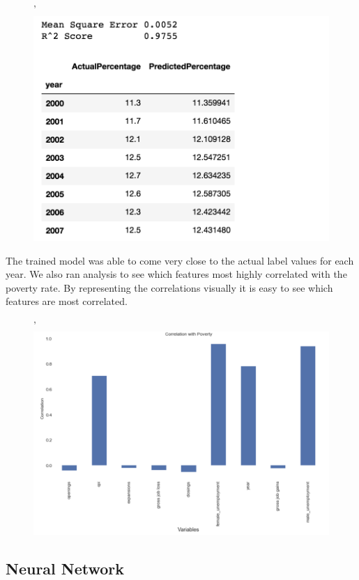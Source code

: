 \documentclass[11pt,letterpaper]{article}
\begin{document}
\begin{figure}[h]'
	\includegraphics[width=\linewidth]{"./pictures/Mse_Score_Predictions"}
\end{figure}

The trained model was able to come very close to the actual label values for each year. We also ran analysis to see which features most highly correlated with the poverty rate. By representing the correlations visually it is easy to see which features are most correlated. 

\begin{figure}[h]'
	\includegraphics[width=\linewidth]{"./pictures/Correlation_With_Poverty"}
\end{figure}

\subsection{Neural Network}
\label{ssec:nnResult}
\end{document}
